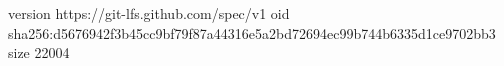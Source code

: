 version https://git-lfs.github.com/spec/v1
oid sha256:d5676942f3b45cc9bf79f87a44316e5a2bd72694ec99b744b6335d1ce9702bb3
size 22004
